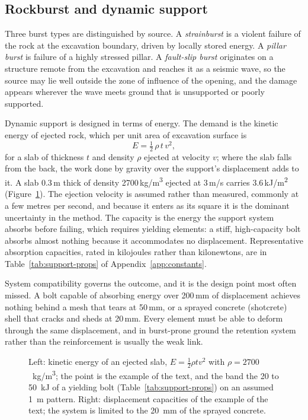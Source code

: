 \subsection{Rockburst and dynamic support}
\label{sec:rockburst-support}

Three burst types are distinguished by source. A \emph{strainburst} is a
violent failure of the rock at the excavation boundary, driven by locally
stored energy. A \emph{pillar burst} is failure of a highly stressed pillar. A
\emph{fault-slip burst} originates on a structure remote from the excavation
and reaches it as a seismic wave, so the source may lie well outside the
zone of influence of the opening, and the damage appears wherever the wave
meets ground that is unsupported or poorly supported.

Dynamic support is designed in terms of energy. The demand is the kinetic energy of
ejected rock, which per unit area of excavation surface is
\[
E = \tfrac{1}{2}\,\rho\, t\, v^{2},
\]
for a slab of thickness $t$ and density $\rho$ ejected at velocity $v$; where
the slab falls from the back, the work done by gravity over the support's
displacement adds to it. A slab 0.3\,m thick of density
2700\,kg/m\textsuperscript{3} ejected at 3\,m/s carries
3.6\,kJ/m\textsuperscript{2} (Figure~\ref{fig:burst-energy}). The ejection velocity is assumed rather than
measured, commonly at a few metres per second, and because it enters as its
square it is the dominant uncertainty in the method. The capacity is the
energy the support system absorbs
before failing, which requires yielding elements: a stiff, high-capacity bolt
absorbs almost nothing because it accommodates no displacement. Representative
absorption capacities, rated in kilojoules rather than kilonewtons, are in
Table~\ref{tab:support-props} of Appendix~\ref{app:constants}.

System compatibility governs the outcome, and it is the design point most
often missed. A bolt capable of absorbing energy over 200\,mm of displacement
achieves nothing behind a mesh that tears at 50\,mm, or a sprayed concrete (shotcrete) shell that
cracks and sheds at 20\,mm. Every element must be able to deform through the
same displacement, and in burst-prone ground the retention system rather than
the reinforcement is usually the weak link.

\begin{figure}[htbp]
\centering
{}
\caption{Left: kinetic energy of an ejected slab, $E = \tfrac{1}{2}\rho t v^2$ with $\rho = 2700$~kg/m\textsuperscript{3}; the point is the example of the text, and the band the 20 to 50~kJ of a yielding bolt (Table~\ref{tab:support-props}) on an assumed 1~m pattern. Right: displacement capacities of the example of the text; the system is limited to the 20~mm of the sprayed concrete.}
\label{fig:burst-energy}
\end{figure}

